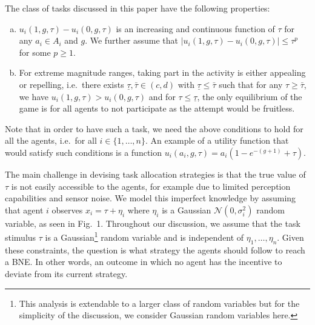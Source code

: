 \documentclass{nature}
\begin{document}
The class of tasks discussed in this paper have the following properties:
\begin{enumerate}[a.]
	\item $u_i(1,g,\tau)-u_i(0,g,\tau)$ is an increasing and continuous function of $\tau$ for any $a_i\in A_i$ and $g$. We further assume that $|u_i(1,g,\tau)-u_i(0,g,\tau)|\leq \tau^p$ for some $p\geq 1$.
	\item For extreme magnitude ranges, taking part in the activity is either appealing or repelling, i.e.\ there exists $\underline{\tau},\bar{\tau}\in (c,d)$ with $\underline{\tau}\leq \bar{\tau}$ such that for any $\tau\geq \bar{\tau}$, we have $u_i(1,g,\tau)>u_i(0,g,\tau)$ and for $\tau\leq \underline{\tau}$, the only equilibrium of the game is for all agents to not participate as the attempt would be fruitless.
\end{enumerate}
Note that in order to have such a task, we need the above conditions to hold for all the agents, i.e.\ for all $i\in\{1,\ldots,n\}$. An example of a utility function that would satisfy such conditions is a function $u_i(a_i,g,\tau)=a_i(1-e^{-(g+1)}+\tau)$. 

The main challenge in devising task allocation strategies is that the true value of $\tau$ is not easily accessible to the agents, for example due to limited perception capabilities and sensor noise.
We model this imperfect knowledge by assuming that agent $i$ observes $x_i=\tau+\eta_i$ where $\eta_i$ is a Gaussian $\mathcal{N}(0,\sigma_i^2)$ random variable, as seen in Fig.~1. Throughout our discussion, we assume that the task stimulus $\tau$ is a Gaussian\footnote{This analysis is extendable to a larger class of random variables but for the simplicity of the discussion, we consider Gaussian random variables here.} random variable and is independent of $\eta_1,\ldots,\eta_n$.  Given these constraints, the question is what strategy the agents should follow to reach a BNE. In other words, an outcome in which no agent has the incentive to deviate from its current strategy.
\end{document}
